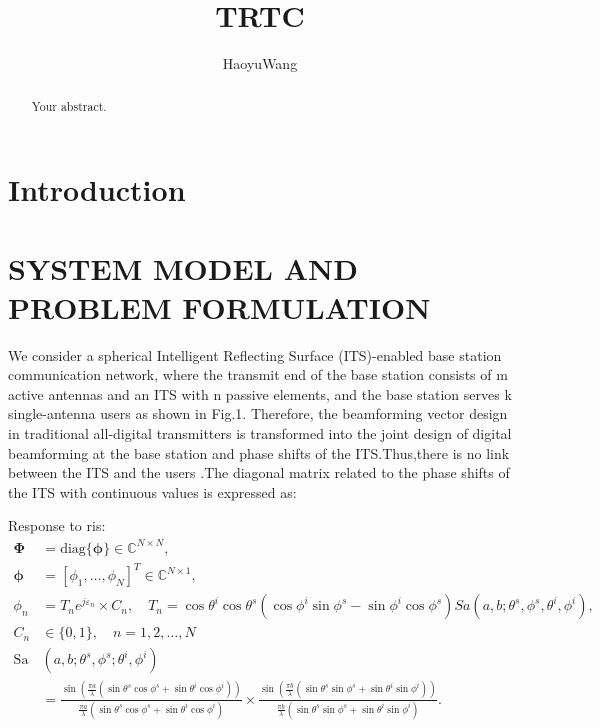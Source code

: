 \documentclass[journal,comsoc]{IEEEtran}
\title{TRTC}
\author{HaoyuWang}
\begin{document}
	\maketitle
	\begin{abstract}
		Your abstract.
	\end{abstract}
	
	\section{Introduction}
	
	\section{SYSTEM MODEL AND PROBLEM FORMULATION}
	
	We consider a spherical Intelligent Reflecting Surface (ITS)-enabled base station communication network, where the transmit end of the base station consists of m active antennas and an ITS with n passive elements, and the base station serves k single-antenna users as shown in Fig.1. Therefore, the beamforming vector design in traditional all-digital transmitters is transformed into the joint design of digital beamforming at the base station and phase shifts of the ITS.Thus,there is no link between the ITS and the users .The diagonal matrix related to the phase shifts of the ITS with continuous values is expressed as:
	
	\noindent Response to ris:
	\begin{align} %
		\boldsymbol{\Phi} &= \mathrm{diag}\{\boldsymbol{\phi}\} \in \mathbb{C}^{N \times N}, \\
		\boldsymbol{\phi} &= [\phi_1, \ldots, \phi_N]^T \in \mathbb{C}^{N \times 1}, \nonumber \\
		\phi_n &= T_n e^{j \varepsilon_n} \times C_n, \quad T_n = \cos\theta^i \cos\theta^s(\cos\phi^i \sin\phi^s - \sin\phi^i \cos\phi^s) 
		Sa(a, b; \theta^s, \phi^s, \theta^i, \phi^i), \nonumber \\
		C_n &\in \{0,1\}, \quad n = 1,2,\ldots,N \nonumber \\
		\mathrm{Sa}&(a, b; \theta^s, \phi^s; \theta^i, \phi^i) \nonumber \\
		&= \frac{\sin\left( \frac{\pi a}{\lambda} (\sin\theta^s \cos\phi^s + \sin\theta^i \cos\phi^i) \right)}{\frac{\pi a}{\lambda} (\sin\theta^s \cos\phi^s + \sin\theta^i \cos\phi^i)} 
		\times \frac{\sin\left( \frac{\pi b}{\lambda} (\sin\theta^s \sin\phi^s + \sin\theta^i \sin\phi^i) \right)}{\frac{\pi b}{\lambda} (\sin\theta^s \sin\phi^s + \sin\theta^i \sin\phi^i)}.\nonumber
	\end{align}
	
\end{document}
